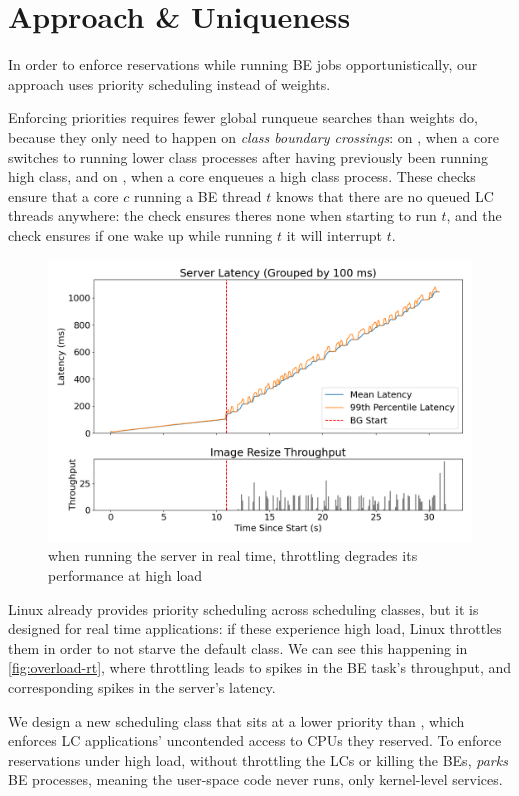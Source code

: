 \section{Approach \& Uniqueness}

In order to enforce reservations while running BE jobs opportunistically, our
approach uses priority scheduling instead of weights.

Enforcing priorities requires fewer global runqueue searches than weights do,
because they only need to happen on \textit{class boundary crossings}: on
\exit{}, when a core switches to running lower class processes after having
previously been running high class, and on \entry{}, when a core enqueues a high
class process. These checks ensure that a core $c$ running a BE thread $t$ knows
that there are no queued LC threads anywhere: the \exit{} check ensures theres
none when starting to run $t$, and the \entry{} check ensures if one wake up
while running $t$ it will interrupt $t$.

\begin{figure}[t]
    \centering
    \includegraphics[width=\columnwidth]{graphs/overload-rt.png}
    \caption{when running the server in real time, throttling degrades
    its performance at high load}\label{fig:overload-rt}
\end{figure}


Linux already provides priority scheduling across scheduling classes, but it is
designed for real time applications: if these experience high load, Linux
throttles them in order to not starve the default class. We can see this
happening in \autoref{fig:overload-rt}, where throttling leads to spikes in the
BE task's throughput, and corresponding spikes in the server's latency.

We design a new scheduling class \beclass{} that sits at a lower priority than
\normalclass{}, which enforces LC applications' uncontended access to CPUs they
reserved. To enforce reservations under high load, without throttling the LCs or
killing the BEs, \beclass{} \textit{parks} BE processes, meaning the user-space
code never runs, only kernel-level services.